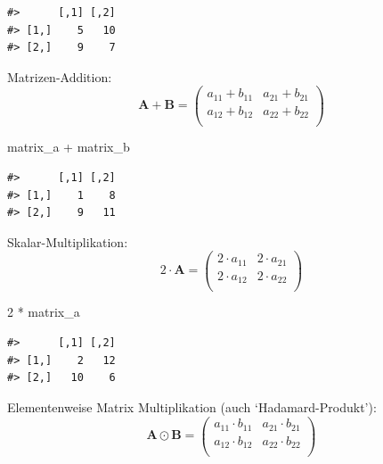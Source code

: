 \documentclass[]{tufte-book}
\newenvironment{Shaded}{}{}
\newcommand{\DecValTok}[1]{\textcolor[rgb]{0.25,0.63,0.44}{#1}}
\newcommand{\StringTok}[1]{\textcolor[rgb]{0.25,0.44,0.63}{#1}}
\newcommand{\OperatorTok}[1]{\textcolor[rgb]{0.40,0.40,0.40}{#1}}
\newcommand{\NormalTok}[1]{#1}
\begin{document}
\begin{verbatim}
#>      [,1] [,2]
#> [1,]    5   10
#> [2,]    9    7
\end{verbatim}

Matrizen-Addition: \[\boldsymbol{A}+\boldsymbol{B}=
\left(
\begin{array}{rrr}                                
a_{11} + b_{11} & a_{21} + b_{21}\\                                               
a_{12} + b_{12} & a_{22} + b_{22}\\                                               
\end{array}
\right)\]

\begin{Shaded}
\begin{Highlighting}[]
\NormalTok{matrix_a }\OperatorTok{+}\StringTok{ }\NormalTok{matrix_b}
\end{Highlighting}
\end{Shaded}

\begin{verbatim}
#>      [,1] [,2]
#> [1,]    1    8
#> [2,]    9   11
\end{verbatim}

Skalar-Multiplikation: \[2\cdot\boldsymbol{A}=
\left( 
\begin{array}{rrr}                                
2\cdot a_{11} & 2\cdot a_{21} \\                                               
2\cdot a_{12} & 2\cdot a_{22} \\                                               
\end{array}
\right)\]

\begin{Shaded}
\begin{Highlighting}[]
\DecValTok{2} \OperatorTok{*}\StringTok{ }\NormalTok{matrix_a}
\end{Highlighting}
\end{Shaded}

\begin{verbatim}
#>      [,1] [,2]
#> [1,]    2   12
#> [2,]   10    6
\end{verbatim}

Elementenweise Matrix Multiplikation (auch `Hadamard-Produkt'):
\[\boldsymbol{A}\odot\boldsymbol{B}=
\left(
\begin{array}{rrr}                                
a_{11}\cdot b_{11} & a_{21}\cdot b_{21}\\                                               
a_{12}\cdot b_{12} & a_{22}\cdot b_{22}\\                                               
\end{array}
\right)\]
\end{document}

